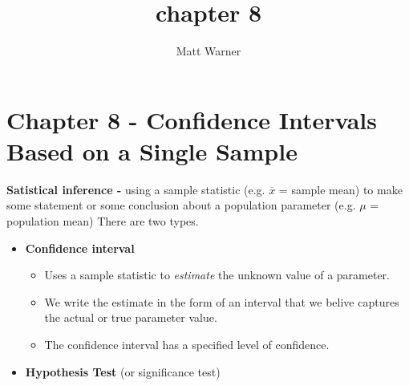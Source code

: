 \documentclass{report}
\title{\Huge{chapter 8}}
\author{\huge{Matt Warner}}
\date{\huge{}}
\begin{document}
  \maketitle
  \section*{Chapter 8 - Confidence Intervals Based on a Single Sample}
    \textbf{Satistical inference - }using a sample statistic (e.g. $\overline{x}$ = sample mean) to make some statement or some conclusion about a population parameter (e.g. $\mu$ = population mean) There are two types.
    \begin{itemize}
      \item \textbf{Confidence interval} 
        \begin{itemize}[label=$\circ$]
          \item Uses a sample statistic to \textit{estimate} the unknown value of a parameter.
          \item We write the estimate in the form of an interval that we belive captures the actual or true parameter value.
          \item The confidence interval has a specified level of confidence.
        \end{itemize}
      \item \textbf{Hypothesis Test} (or significance test)
    \end{itemize}
    \bigbreak \noindent
\end{document}
